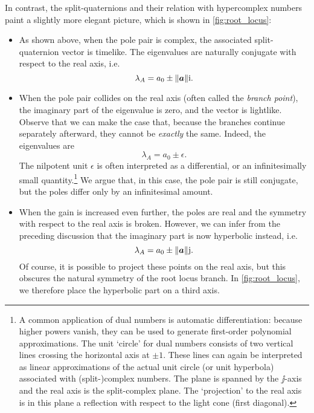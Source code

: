 In contrast, the split-quaternions and their relation with hypercomplex numbers paint a slightly more elegant picture, which is shown in \cref{fig:root_locus}:
\begin{itemize}
    \item As shown above, when the pole pair is complex, the associated split-quaternion vector is timelike. The eigenvalues are naturally conjugate with respect to the real axis, i.e.
        \begin{equation}
             \lambda_A = a_0 \pm \norm{\vec{a}}\ii.
        \end{equation}
    \item When the pole pair collides on the real axis (often called the \emph{branch point}), the imaginary part of the eigenvalue is zero, and the vector is lightlike. Observe that we can make the case that, because the branches continue separately afterward, they cannot be \emph{exactly} the same. Indeed, the eigenvalues are
        \begin{equation}
             \lambda_A = a_0 \pm \epsilon.
        \end{equation}
        The nilpotent unit \(\epsilon\) is often interpreted as a differential, or an infinitesimally small quantity.\footnote{A common application of dual numbers is automatic differentiation: because higher powers vanish, they can be used to generate first-order polynomial approximations. The unit `circle' for dual numbers consists of two vertical lines crossing the horizontal axis at \(\pm 1\). These lines can again be interpreted as linear approximations of the actual unit circle (or unit hyperbola) associated with (split-)complex numbers. The plane is spanned by the \(\jj\)-axis and the real axis is the split-complex plane. The `projection' to the real axis is in this plane a reflection with respect to the light cone (first diagonal).} We argue that, in this case, the pole pair is still conjugate, but the poles differ only by an infinitesimal amount.
    \item When the gain is increased even further, the poles are real and the symmetry with respect to the real axis is broken. However, we can infer from the preceding discussion that the imaginary part is now hyperbolic instead, i.e.
        \begin{equation}
             \lambda_A = a_0 \pm \norm{\vec{a}}\jj.
        \end{equation}
        Of course, it is possible to project these points on the real axis, but this obscures the natural symmetry of the root locus branch. In \cref{fig:root_locus}, we therefore place the hyperbolic part on a third axis.
\end{itemize}

